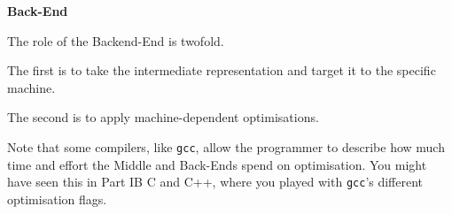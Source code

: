 \begin{minipage}[t]{0.15\textwidth}
\textbf{\sffamily Back-End}    
\end{minipage}%
\begin{minipage}[t]{0.85\textwidth}    
    The role of the Backend-End is twofold. 

    The first is to take the intermediate representation and target it to the specific machine. 

    The second is to apply machine-dependent optimisations. 
\end{minipage}

Note that some compilers, like \texttt{gcc}, allow the programmer to describe how much time and effort the Middle and Back-Ends spend on optimisation. You might have seen this in {\sffamily Part IB C and C++}, where you played with \texttt{gcc}'s different optimisation flags.